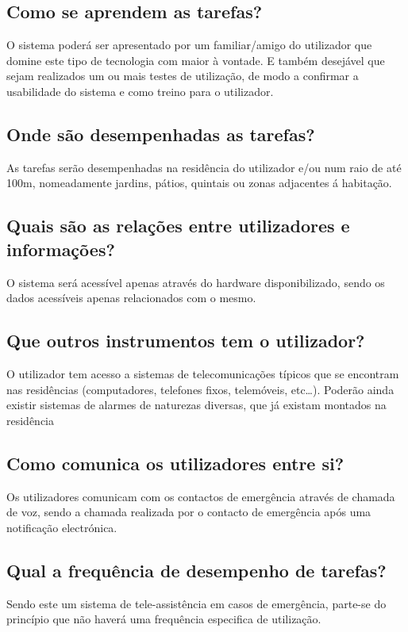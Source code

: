 \subsection{Como se aprendem as tarefas?}
O sistema poderá ser apresentado por um familiar/amigo do utilizador que domine este tipo de tecnologia com maior à vontade. E também desejável que sejam realizados um ou mais testes de utilização, de modo a confirmar a usabilidade do sistema e como treino para o utilizador.

\subsection{Onde são desempenhadas as tarefas?}
As tarefas serão desempenhadas na residência do utilizador e/ou num raio de até 100m, nomeadamente jardins, pátios, quintais ou zonas adjacentes á habitação.

\subsection{Quais são as relações entre utilizadores e informações?}
O sistema será acessível apenas através do hardware disponibilizado, sendo os dados acessíveis apenas relacionados com o mesmo.

\subsection{Que outros instrumentos tem o utilizador?}
O utilizador tem acesso a sistemas de telecomunicações típicos que se encontram nas residências (computadores, telefones fixos, telemóveis, etc…). Poderão ainda existir sistemas de alarmes de naturezas diversas, que já existam montados na residência

\subsection{Como comunica os utilizadores entre si?}
Os utilizadores comunicam com os contactos de emergência através de chamada de voz, sendo a chamada realizada por o contacto de emergência após uma notificação electrónica.

\subsection{Qual a frequência de desempenho de tarefas?}
Sendo este um sistema de tele-assistência em casos de emergência, parte-se do princípio que não haverá uma frequência especifica de utilização.

